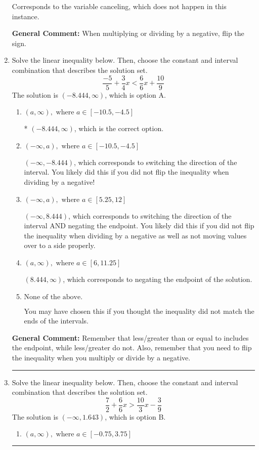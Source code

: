 \documentclass{extbook}[14pt]
\newcommand{\litem}[1]{\item #1

\rule{\textwidth}{0.4pt}}
\begin{document}
\begin{enumerate}
{\begin{enumerate}[label=\Alph*.]
Corresponds to the variable canceling, which does not happen in this instance.
\end{enumerate}

\textbf{General Comment:} When multiplying or dividing by a negative, flip the sign.
}
\litem{
Solve the linear inequality below. Then, choose the constant and interval combination that describes the solution set.
\[ \frac{-5}{5} + \frac{3}{4} x < \frac{6}{6} x + \frac{10}{9} \]The solution is \( (-8.444, \infty) \), which is option A.\begin{enumerate}[label=\Alph*.]
\item \( (a, \infty), \text{ where } a \in [-10.5, -4.5] \)

* $(-8.444, \infty)$, which is the correct option.
\item \( (-\infty, a), \text{ where } a \in [-10.5, -4.5] \)

 $(-\infty, -8.444)$, which corresponds to switching the direction of the interval. You likely did this if you did not flip the inequality when dividing by a negative!
\item \( (-\infty, a), \text{ where } a \in [5.25, 12] \)

 $(-\infty, 8.444)$, which corresponds to switching the direction of the interval AND negating the endpoint. You likely did this if you did not flip the inequality when dividing by a negative as well as not moving values over to a side properly.
\item \( (a, \infty), \text{ where } a \in [6, 11.25] \)

 $(8.444, \infty)$, which corresponds to negating the endpoint of the solution.
\item \( \text{None of the above}. \)

You may have chosen this if you thought the inequality did not match the ends of the intervals.
\end{enumerate}

\textbf{General Comment:} Remember that less/greater than or equal to includes the endpoint, while less/greater do not. Also, remember that you need to flip the inequality when you multiply or divide by a negative.
}
\litem{
Solve the linear inequality below. Then, choose the constant and interval combination that describes the solution set.
\[ \frac{7}{2} + \frac{6}{6} x > \frac{10}{3} x - \frac{3}{9} \]The solution is \( (-\infty, 1.643) \), which is option B.\begin{enumerate}[label=\Alph*.]
\item \( (a, \infty), \text{ where } a \in [-0.75, 3.75] \)


\end{enumerate}}
\end{enumerate}
\end{document}
